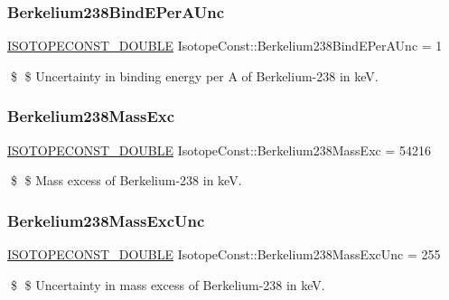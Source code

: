 \subsubsection{\texorpdfstring{Berkelium238\+Bind\+E\+Per\+A\+Unc}{Berkelium238BindEPerAUnc}}
{\footnotesize\ttfamily \mbox{\hyperlink{group___isotope_const-_macros_ga8f45a7272ce02c0b4c65c44636ed719a}{I\+S\+O\+T\+O\+P\+E\+C\+O\+N\+S\+T\+\_\+\+D\+O\+U\+B\+LE}} Isotope\+Const\+::\+Berkelium238\+Bind\+E\+Per\+A\+Unc = 1}

\$ \$ Uncertainty in binding energy per A of Berkelium-\/238 in keV. \mbox{\label{group___isotope_const-_berkelium-_bk238_ga0c614a1d23ffaeb1dd0d6447fecc0001}} 
\subsubsection{\texorpdfstring{Berkelium238\+Mass\+Exc}{Berkelium238MassExc}}
{\footnotesize\ttfamily \mbox{\hyperlink{group___isotope_const-_macros_ga8f45a7272ce02c0b4c65c44636ed719a}{I\+S\+O\+T\+O\+P\+E\+C\+O\+N\+S\+T\+\_\+\+D\+O\+U\+B\+LE}} Isotope\+Const\+::\+Berkelium238\+Mass\+Exc = 54216}

\$ \$ Mass excess of Berkelium-\/238 in keV. \mbox{\label{group___isotope_const-_berkelium-_bk238_gadeb505b2f3cbf1a01cd93b0c22da81b4}} 
\subsubsection{\texorpdfstring{Berkelium238\+Mass\+Exc\+Unc}{Berkelium238MassExcUnc}}
{\footnotesize\ttfamily \mbox{\hyperlink{group___isotope_const-_macros_ga8f45a7272ce02c0b4c65c44636ed719a}{I\+S\+O\+T\+O\+P\+E\+C\+O\+N\+S\+T\+\_\+\+D\+O\+U\+B\+LE}} Isotope\+Const\+::\+Berkelium238\+Mass\+Exc\+Unc = 255}

\$ \$ Uncertainty in mass excess of Berkelium-\/238 in keV. \mbox{\label{group___isotope_const-_berkelium-_bk238_ga248c7aa7649aa6337e2cc0648aa3db4a}} 
